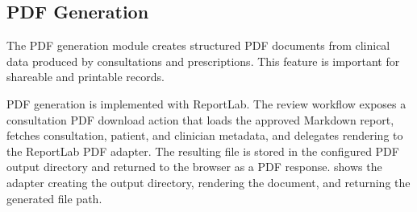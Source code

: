 \subsection{PDF Generation}
\label{subsec:pdf-generation}

The PDF generation module creates structured PDF documents from clinical data produced by consultations and prescriptions. This feature is important for shareable and printable records.

PDF generation is implemented with ReportLab. The review workflow exposes a consultation PDF download action that loads the approved Markdown report, fetches consultation, patient, and clinician metadata, and delegates rendering to the ReportLab PDF adapter. The resulting file is stored in the configured PDF output directory and returned to the browser as a PDF response.  shows the adapter creating the output directory, rendering the document, and returning the generated file path.


